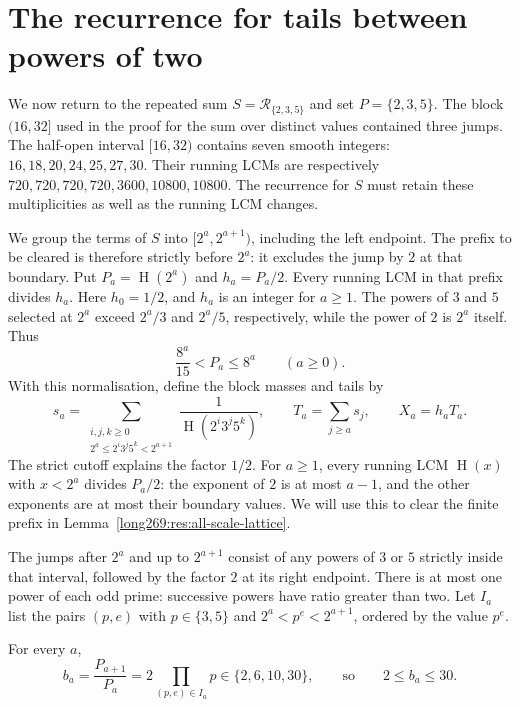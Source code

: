 \documentclass[11pt]{article}
\theoremstyle{remark}
\theoremstyle{plain}
\newcommand{\hgt}{\operatorname{H}}
\begin{document}
\section{The recurrence for tails between powers of two}\label{long269:sec:blocks}

We now return to the repeated sum $S=\mathcal R_{\{2,3,5\}}$ and set
$P=\{2,3,5\}$. The block $(16,32]$ used in the proof for the sum over distinct values
contained three jumps. The half-open interval $[16,32)$ contains seven
smooth integers: $16,18,20,24,25,27,30$. Their running LCMs are respectively
$720,720,720,720,3600,10800,10800$. The recurrence for $S$ must retain
these multiplicities as well as the running LCM changes.

We group the terms of $S$ into $[2^a,2^{a+1})$, including the left
endpoint. The prefix to be cleared is therefore strictly before $2^a$:
it excludes the jump by $2$ at that boundary. Put $P_a=\hgt(2^a)$ and
$h_a=P_a/2$. Every running LCM in that prefix divides $h_a$.
Here $h_0=1/2$, and $h_a$ is an integer for $a\ge1$.
The powers of $3$ and $5$ selected at $2^a$ exceed $2^a/3$ and $2^a/5$,
respectively, while the power of $2$ is $2^a$ itself. Thus
\[
 \frac{8^a}{15}<P_a\le8^a\qquad(a\ge0).
\]
With this normalisation, define the block masses and tails by
\begin{equation}\label{long269:eq:actual-tail}
 s_a=\sum_{\substack{i,j,k\ge0\\2^a\le2^i3^j5^k<2^{a+1}}}
         \frac1{\hgt(2^i3^j5^k)},\qquad
 T_a=\sum_{j\ge a}s_j,\qquad X_a=h_aT_a.
\end{equation}
The strict cutoff explains the factor $1/2$. For $a\ge1$,
every running LCM $\hgt(x)$ with $x<2^a$ divides $P_a/2$: the exponent of $2$ is at most
$a-1$, and the other exponents are at most their boundary values.
We will use this to clear the finite prefix in
Lemma~\ref{long269:res:all-scale-lattice}.

The jumps after $2^a$ and up to $2^{a+1}$ consist of any powers of $3$ or
$5$ strictly inside that interval, followed by the factor $2$ at its right
endpoint.  There is at most one power of each odd prime: successive
powers have ratio greater than two.  Let $I_a$ list the pairs $(p,e)$ with
$p\in\{3,5\}$ and $2^a<p^e<2^{a+1}$, ordered by the value $p^e$.

\begin{proposition}\label{long269:res:dyadic-alphabet}
For every $a$,
\begin{equation}\label{long269:eq:dyadic-alphabet}
 b_a=\frac{P_{a+1}}{P_a}=2\prod_{(p,e)\in I_a}p\in\{2,6,10,30\},
 \qquad\text{so}\qquad 2\le b_a\le30 .
\end{equation}
\end{proposition}
\end{document}

